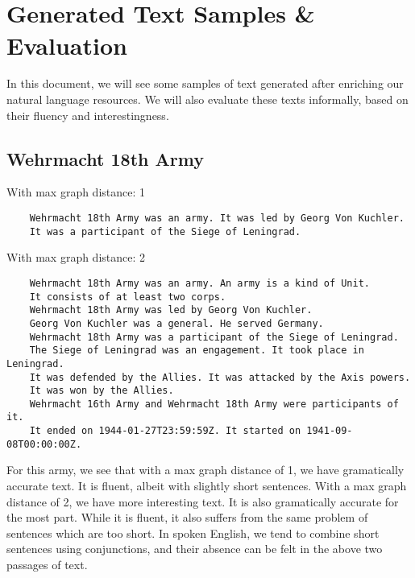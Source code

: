 \documentclass[12pt, letterpaper]{article}
\title{
\vspace{2in}
\textmd{\textbf{\hmwkTitle\\ \large\hmwkClass}}\\
\normalsize\vspace{0.1in}\large{\groupMemberOne}\\
\normalsize\vspace{0.1in}\large{\groupMemberTwo}\\
\normalsize\vspace{0.1in}\large{\groupMemberThree}\\
\normalsize\vspace{0.1in}\large{\groupMemberFour}\\
\vspace{3in}
}
\begin{document}
  \maketitle
  \newpage

  \section*{Generated Text Samples \& Evaluation}

  In this document, we will see some samples of text generated after enriching our natural language resources.
  We will also evaluate these texts informally, based on their fluency and interestingness.

  \subsection*{Wehrmacht 18th Army}

  With max graph distance: 1
  \begin{lstlisting}
	Wehrmacht 18th Army was an army. It was led by Georg Von Kuchler. 
	It was a participant of the Siege of Leningrad.
  \end{lstlisting}

  \noindent
  With max graph distance: 2
  \begin{lstlisting}
	Wehrmacht 18th Army was an army. An army is a kind of Unit. 
	It consists of at least two corps. 
	Wehrmacht 18th Army was led by Georg Von Kuchler. 
	Georg Von Kuchler was a general. He served Germany. 
	Wehrmacht 18th Army was a participant of the Siege of Leningrad. 
	The Siege of Leningrad was an engagement. It took place in Leningrad. 
	It was defended by the Allies. It was attacked by the Axis powers. 
	It was won by the Allies. 
	Wehrmacht 16th Army and Wehrmacht 18th Army were participants of it. 
	It ended on 1944-01-27T23:59:59Z. It started on 1941-09-08T00:00:00Z.
  \end{lstlisting}

  \vspace{4mm}

  \noindent
  For this army, we see that with a max graph distance of 1, we have gramatically accurate text.
  It is fluent, albeit with slightly short sentences.
  With a max graph distance of 2, we have more interesting text. It is also gramatically accurate for the most part.
  While it is fluent, it also suffers from the same problem of sentences which are too short.
  In spoken English, we tend to combine short sentences using conjunctions, and their absence can be felt in the above
  two passages of text.
\end{document}
